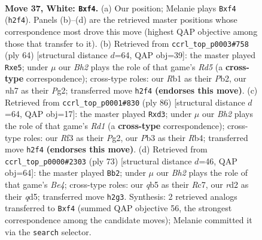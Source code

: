 \documentclass[11pt]{article}
\begin{document}
\clearpage

\begin{figure}[p]\centering
\begin{subfigure}{0.46\textwidth}\centering
\resizebox{\linewidth}{!}{%
\newchessgame
\chessboard[
  setfen={5rk1/7n/8/pqp4Q/5p2/1P3R2/P2r3B/1R4K1 w - - 0 37},
  showmover=false,
  pgfstyle=straightmove, color=movearrow, markmove={h2-f4}
]}
\caption{}
\end{subfigure}\hfill
\begin{subfigure}{0.46\textwidth}\centering
\resizebox{\linewidth}{!}{%
\newchessgame
\chessboard[
  setfen={1r1r3k/6q1/2B4p/1P1Rpp2/7P/2Q5/1P3KP1/8 w - - 0 33},
  showmover=false,
  pgfstyle=straightmove, color=movearrow, markmove={d5-e5}
]}
\caption{}
\end{subfigure}
\\[4pt]
\begin{subfigure}{0.46\textwidth}\centering
\resizebox{\linewidth}{!}{%
\newchessgame
\chessboard[
  setfen={5q1k/p2n1p2/7r/4rBQP/1R6/3p4/6P1/3R2K1 w - - 0 44},
  showmover=false,
  pgfstyle=straightmove, color=movearrow, markmove={d1-d3}
]}
\caption{}
\end{subfigure}\hfill
\begin{subfigure}{0.46\textwidth}\centering
\resizebox{\linewidth}{!}{%
\newchessgame
\chessboard[
  setfen={5r1k/2r4p/3p1P2/3Qb3/8/5R2/2P1R1PP/q1NK4 b - - 4 37},
  showmover=false,
  pgfstyle=straightmove, color=movearrow, markmove={e5-b2}
]}
\caption{}
\end{subfigure}
\caption{\textbf{Move 37, White: \texttt{Bxf4}.} (a) Our position; Melanie plays \texttt{Bxf4} (\texttt{h2f4}). Panels (b)--(d) are the retrieved master positions whose correspondence most drove this move (highest QAP objective among those that transfer to it). (b) Retrieved from \texttt{ccrl\_top\_p0003\#758} (ply 64) [structural distance $d$=64, QAP obj=39]: the master played \texttt{Rxe5}; under $\mu$ our \emph{Bh2} plays the role of that game's \emph{Rd5} (a \textbf{cross-type} correspondence); cross-type roles: our \emph{R}b1 as their \emph{P}b2, our \emph{n}h7 as their \emph{P}g2; transferred move \texttt{h2f4} \textbf{(endorses this move)}. (c) Retrieved from \texttt{ccrl\_top\_p0001\#830} (ply 86) [structural distance $d$=64, QAP obj=17]: the master played \texttt{Rxd3}; under $\mu$ our \emph{Bh2} plays the role of that game's \emph{Rd1} (a \textbf{cross-type} correspondence); cross-type roles: our \emph{R}f3 as their \emph{P}g2, our \emph{P}b3 as their \emph{R}b4; transferred move \texttt{h2f4} \textbf{(endorses this move)}. (d) Retrieved from \texttt{ccrl\_top\_p0000\#2303} (ply 73) [structural distance $d$=46, QAP obj=64]: the master played \texttt{Bb2}; under $\mu$ our \emph{Bh2} plays the role of that game's \emph{Be4}; cross-type roles: our \emph{q}b5 as their \emph{R}c7, our \emph{r}d2 as their \emph{q}d5; transferred move \texttt{h2g3}. Synthesis: 2 retrieved analogs transferred to \texttt{Bxf4} (summed QAP objective 56, the strongest correspondence among the candidate moves); Melanie committed it via the \texttt{search} selector.}
\label{fig:thought-m72}
\end{figure}
\end{document}
